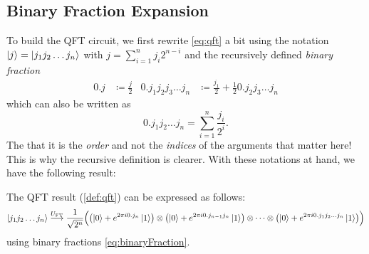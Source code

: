 		\subsection{Binary Fraction Expansion}
			To build the \ac{QFT} circuit, we first rewrite \eqref{eq:qft} a bit using the notation \( \ket{j} = \ket{j_1 j_2 \dots j_n} \) with \( j = \sum_{i = 1}^{n} j_i 2^{n - i} \) and the recursively defined \emph{binary fraction}
			\begin{align}
				0.j                     & \coloneqq \frac{j}{2}                                     &
				0.j_1 j_2 j_3 \dots j_n & \coloneqq \frac{j_1}{2} + \frac{1}{2} 0.j_2 j_3 \dots j_n
				\label{eq:binaryFraction}
			\end{align}
			which can also be written as
			\begin{equation}
				0.j_1 j_2 \dots j_n = \sum_{i = 1}^{n} \frac{j_i}{2^i}.
			\end{equation}
			The that it is the \emph{order} and not the \emph{indices} of the arguments that matter here! This is why the recursive definition is clearer. With these notations at hand, we have the following result:
			\begin{theorem}
				The \ac{QFT} result (\autoref{def:qft}) can be expressed as follows:
				\begin{equation}
					\ket{j_1 j_2 \dots j_n}
					\overset{U_\mathrm{FT}}{\longrightarrow}
					\frac{1}{\sqrt{2^n}} \Bigl( \bigl( \ket{0} + e^{2 \pi i 0.j_n} \ket{1} \bigr) \otimes \bigl( \ket{0} + e^{2 \pi i 0.j_{n - 1} j_n} \ket{1} \bigr) \otimes \dots \otimes \bigl( \ket{0} + e^{2 \pi i 0.j_1 j_2 \dots j_n} \ket{1} \bigr) \Bigr)
				\end{equation}
				using binary fractions \eqref{eq:binaryFraction}.
			\end{theorem}
